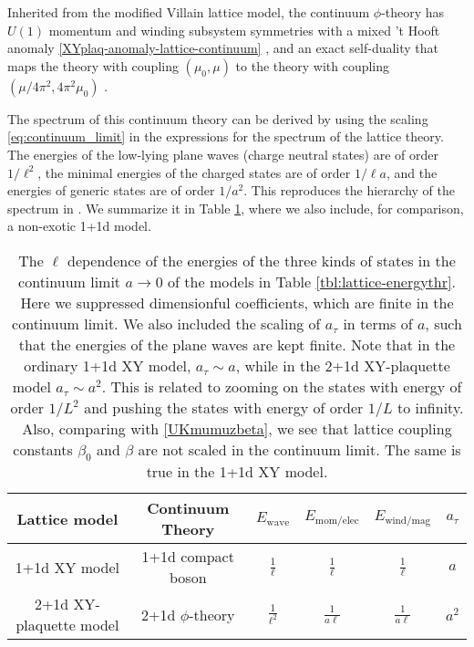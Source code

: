 \documentclass[12pt]{article}
\numberwithin{equation}{section}
\begin{document}
Inherited from the modified Villain lattice model, the continuum $\phi$-theory has $U(1)$ momentum and winding subsystem symmetries with a mixed 't Hooft anomaly \eqref{XYplaq-anomaly-lattice-continuum} \cite{Gorantla:2021svj}, and an exact self-duality that maps the theory with coupling $(\mu_0,\mu)$ to the theory with coupling $({\mu}/{4\pi^2},4\pi^2\mu_0)$ \cite{paper1}.

The spectrum of this continuum theory can be derived by using the scaling \eqref{eq:continuum_limit} in the expressions for the spectrum of the lattice theory.  The energies of the low-lying plane waves (charge neutral states) are of order $1/ \ell^2$, the minimal energies of the charged states are of order $1/ \ell a$, and the energies of generic states are of order $1/ a^2$. This reproduces the hierarchy of the spectrum in \cite{paper1}.  We summarize it in Table \ref{tbl:cont2-energyth}, where we also include, for comparison, a non-exotic 1+1d model.

\begin{table}[t]
\begin{center}
\begin{tabular}{|c|c|c|c|c|c|}
\hline
Lattice model & Continuum Theory & $E_\text{wave}$ & $E_\text{mom/elec}$ & $E_\text{wind/mag}$ & $a_\tau$
\tabularnewline
\hline
1+1d XY model& 1+1d compact boson & $\frac{1}{\ell}$ & $\frac{1}{\ell}$ & $\frac{1}{\ell}$ & $a$
\tabularnewline
\hline
2+1d XY-plaquette model& 2+1d $\phi$-theory & $\frac{1}{\ell^2}$ & $\frac{1}{a \ell}$ & $\frac{1}{a \ell}$ & $a^2$
\tabularnewline
\hline
\end{tabular}
\caption{The $\ell $ dependence of the energies of the three kinds of states in the continuum limit $a \rightarrow 0$ of the models in Table \ref{tbl:lattice-energythr}.  Here we suppressed dimensionful coefficients, which are finite in the continuum limit. We also included the scaling of $a_\tau$ in terms of $a$, such that the energies of the plane waves are kept finite.  Note that in the ordinary 1+1d XY model, $a_\tau \sim a$, while in the 2+1d XY-plaquette model $a_\tau \sim a^2$.  This is related to zooming on the states with energy of order $1/L^2$ and pushing the states with energy of order $1/L$ to infinity.  Also, comparing with \eqref{UKmumuzbeta}, we see that lattice coupling constants $\beta_0$ and $\beta$ are not scaled in the continuum limit.  The same is true in the 1+1d XY model.}\label{tbl:cont2-energyth}
\end{center}
\end{table}
\end{document}
